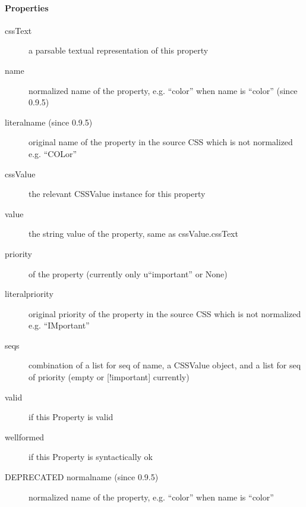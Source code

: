 \paragraph*{Properties}
\label{properties}
\begin{description}
\item[{cssText}] \leavevmode 
a parsable textual representation of this property

\item[{name}] \leavevmode 
normalized name of the property, e.g. ``color'' when name is ``color''
(since 0.9.5)

\item[{literalname (since 0.9.5)}] \leavevmode 
original name of the property in the source CSS which is not normalized
e.g. ``COLor''

\item[{cssValue}] \leavevmode 
the relevant CSSValue instance for this property

\item[{value}] \leavevmode 
the string value of the property, same as cssValue.cssText

\item[{priority}] \leavevmode 
of the property (currently only u``important'' or None)

\item[{literalpriority}] \leavevmode 
original priority of the property in the source CSS which is not
normalized e.g. ``IMportant''

\item[{seqs}] \leavevmode 
combination of a list for seq of name, a CSSValue object, and
a list for seq of  priority (empty or {[}!important{]} currently)

\item[{valid}] \leavevmode 
if this Property is valid

\item[{wellformed}] \leavevmode 
if this Property is syntactically ok

\item[{DEPRECATED normalname (since 0.9.5)}] \leavevmode 
normalized name of the property, e.g. ``color'' when name is ``color''

\end{description}



\hypertarget{format}{}
